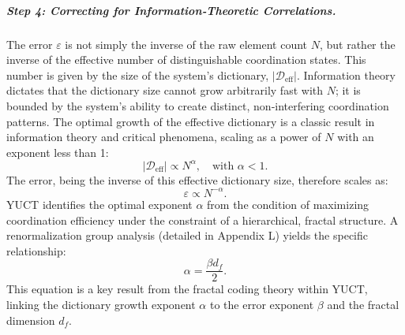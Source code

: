 \documentclass[12pt,a4paper]{article}
\theoremstyle{remark}
\begin{document}
\subparagraph*{Step 4: Correcting for Information‑Theoretic Correlations.}
The error \(\varepsilon\) is not simply the inverse of the raw element count \(N\), but rather the inverse of the effective number of distinguishable coordination states. This number is given by the size of the system's dictionary, \(|\mathcal{D}_{\text{eff}}|\). Information theory dictates that the dictionary size cannot grow arbitrarily fast with \(N\); it is bounded by the system's ability to create distinct, non‑interfering coordination patterns. The optimal growth of the effective dictionary is a classic result in information theory and critical phenomena, scaling as a power of \(N\) with an exponent less than 1:
\begin{equation}
	|\mathcal{D}_{\text{eff}}| \propto N^{\alpha}, \quad \text{with } \alpha < 1.
	\label{eq:dict_scale}
\end{equation}
The error, being the inverse of this effective dictionary size, therefore scales as:
\begin{equation}
	\varepsilon \propto N^{-\alpha}.
	\label{eq:error_scale_corrected}
\end{equation}
YUCT identifies the optimal exponent \(\alpha\) from the condition of maximizing coordination efficiency under the constraint of a hierarchical, fractal structure. A renormalization group analysis (detailed in Appendix L) yields the specific relationship:
\begin{equation}
	\alpha = \frac{\beta d_f}{2}.
	\label{eq:alpha_from_beta}
\end{equation}
This equation is a key result from the fractal coding theory within YUCT, linking the dictionary growth exponent \(\alpha\) to the error exponent \(\beta\) and the fractal dimension \(d_f\).
\end{document}
